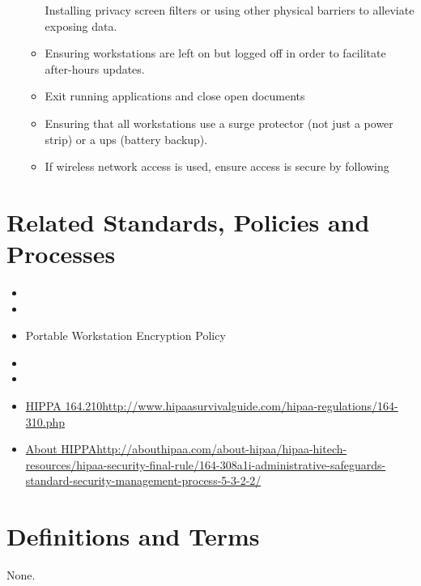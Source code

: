 \begin{enumerate}
\begin{itemize}
Installing privacy screen filters or using other physical barriers to alleviate exposing data. 
\item
Ensuring workstations are left on but logged off in order to facilitate after-hours updates.
\item
Exit running applications and close open documents
\item
Ensuring that all workstations use a surge protector (not just a power strip) or a \gls{ups} (battery backup).
\item
If wireless network access is used, ensure access is secure by following 
\end{itemize}
\end{enumerate}
\CommonPolicyCompliance
\section{Related Standards, Policies\oxford{} and Processes}
\begin{itemize}
\item
{}
\item
{}
\item
Portable Workstation Encryption Policy
\item
{}
\item
{}
\item
\href{http://www.hipaasurvivalguide.com/hipaa-regulations/164-310.php}{HIPPA 164.210}\newline\url{http://www.hipaasurvivalguide.com/hipaa-regulations/164-310.php}
\item
\href{http://abouthipaa.com/about-hipaa/hipaa-hitech-resources/hipaa-security-final-rule/164-308a1i-administrative-safeguards-standard-security-management-process-5-3-2-2/}{About HIPPA}\newline\url{http://abouthipaa.com/about-hipaa/hipaa-hitech-resources/hipaa-security-final-rule/164-308a1i-administrative-safeguards-standard-security-management-process-5-3-2-2/}
\end{itemize}
\section{Definitions and Terms}
None.
\CommonRevisionHistory